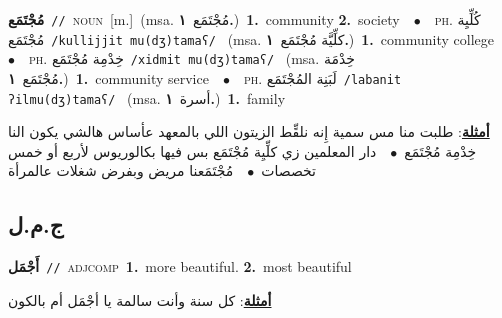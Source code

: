 \documentclass[10pt,a4paper,twoside]{article} %
\begin{document}
\begin{multicols}{2}
{\setlength\topsep{0pt}\textbf{\foreignlanguage{arabic}{مُجْتَمَع}}\ {\color{gray}\texttt{//}\color{black}}\ \textsc{noun}\ [m.]\ \color{gray}(msa. \foreignlanguage{arabic}{مُجْتَمَع}~\foreignlanguage{arabic}{\textbf{١.}})\color{black}\ \textbf{1.}~community  \textbf{2.}~society\ \ $\bullet$\ \ \textsc{ph.} \color{gray} \foreignlanguage{arabic}{كُلِّيِة مُجْتَمَع}\color{black}\ {\color{gray}\texttt{/{\sffamily kullijjit mu(dʒ)tamaʕ}/}\color{black}}\ \color{gray} (msa. \foreignlanguage{arabic}{كلِّيَّة مُجْتَمَع}~\foreignlanguage{arabic}{\textbf{١.}})\color{black}\ \textbf{1.}~community college\ \ $\bullet$\ \ \textsc{ph.} \color{gray} \foreignlanguage{arabic}{خِدْمِة مُجْتَمَع}\color{black}\ {\color{gray}\texttt{/{\sffamily xidmit mu(dʒ)tamaʕ}/}\color{black}}\ \color{gray} (msa. \foreignlanguage{arabic}{خِدْمَة مُجْتَمَع}~\foreignlanguage{arabic}{\textbf{١.}})\color{black}\ \textbf{1.}~community service\ \ $\bullet$\ \ \textsc{ph.} \color{gray} \foreignlanguage{arabic}{لَبَنِة المُجْتَمَع}\color{black}\ {\color{gray}\texttt{/{\sffamily labanit ʔilmu(dʒ)tamaʕ}/}\color{black}}\ \color{gray} (msa. \foreignlanguage{arabic}{أسرة}~\foreignlanguage{arabic}{\textbf{١.}})\color{black}\ \textbf{1.}~family\  \begin{flushright}\color{gray}\foreignlanguage{arabic}{\textbf{\underline{\foreignlanguage{arabic}{أمثلة}}}: طلبت منا مس سمية إِنه نلقِّط الزيتون اللي بالمعهد عأساس هالشي يكون النا خِدْمِة مُجْتَمَع\ $\bullet$\ \  دار المعلمين زي كلِّيِة مُجْتَمَع بس فيها بكالوريوس لأربع أو خمس تخصصات\ $\bullet$\ \  مُجْتَمَعنا مريض وبفرض شغلات عالمرأة}\end{flushright}\color{black}} \vspace{2mm}

\vspace{-3mm}
\subsection*{\color{blue}\foreignlanguage{arabic}{ج.م.ل}\color{blue}{}} 

{\setlength\topsep{0pt}\textbf{\foreignlanguage{arabic}{أَجْمَل}}\ {\color{gray}\texttt{//}\color{black}}\ \textsc{adj\textunderscore comp}\ \textbf{1.}~more beautiful.  \textbf{2.}~most beautiful\  \begin{flushright}\color{gray}\foreignlanguage{arabic}{\textbf{\underline{\foreignlanguage{arabic}{أمثلة}}}: كل سنة وأنت سالمة يا أجْمَل أم بالكون}\end{flushright}\color{black}} \vspace{2mm}


\end{multicols}
\end{document}
